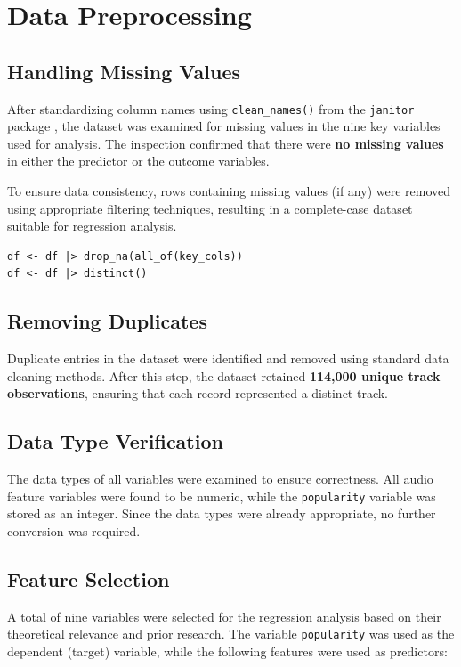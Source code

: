 \documentclass[12pt,a4paper]{article}
\begin{document}
\section{Data Preprocessing}
\label{sec:preprocessing}

\subsection{Handling Missing Values}

After standardizing column names using \texttt{clean\_names()} from the \texttt{janitor} package
\citep{rcoreteam2023}, the
dataset was examined for missing values in the nine key variables used
for analysis. The inspection confirmed that there were \textbf{no missing
values} in either the predictor or the outcome variables.

To ensure data consistency, rows containing missing values (if any) were
removed using appropriate filtering techniques, resulting in a
complete-case dataset suitable for regression analysis.
\begin{verbatim}
df <- df |> drop_na(all_of(key_cols))
df <- df |> distinct()
\end{verbatim}
\subsection{Removing Duplicates}

Duplicate entries in the dataset were identified and removed using
standard data cleaning methods. After this step, the dataset retained
\textbf{114{,}000 unique track observations}, ensuring that each record
represented a distinct track.

\subsection{Data Type Verification}

The data types of all variables were examined to ensure correctness.
All audio feature variables were found to be numeric, while the
\texttt{popularity} variable was stored as an integer. Since the data
types were already appropriate, no further conversion was required.

\subsection{Feature Selection}

A total of nine variables were selected for the regression analysis
based on their theoretical relevance and prior research. The variable
\texttt{popularity} was used as the dependent (target) variable, while
the following features were used as predictors:
\end{document}

